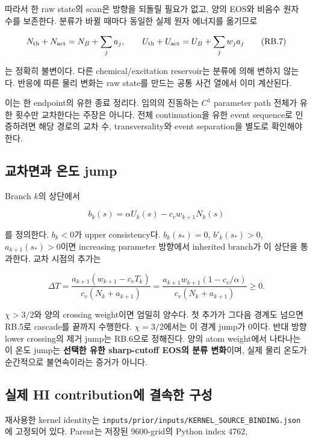 \documentclass[11pt,a4paper]{article}
\begin{document}
따라서 한 raw state의 scan은 방향을 되돌릴 필요가 없고, 양의 EOS와 비음수 원자 수를 보존한다. 분류가 바뀔 때마다 동일한 실제 원자 에너지를 옮기므로

\[N_{\rm th}+N_{\rm act}=N_B+\sum_j a_j,\qquad U_{\rm th}+U_{\rm act}=U_B+\sum_jw_ja_j\tag{RB.7}\]

는 정확히 불변이다. 다른 chemical/excitation reservoir는 분류에 의해 변하지 않는다. 반응에 따른 물리 변화는 raw state를 만드는 공통 사건 열에서 이미 계산된다.

이는 한 endpoint의 유한 종료 정리다. 임의의 진동하는 \(C^1\) parameter path 전체가 유한 횟수만 교차한다는 주장은 아니다. 전체 continuation을 유한 event sequence로 인증하려면 해당 경로의 교차 수, transversality와 event separation을 별도로 확인해야 한다.

\hypertarget{uxad50uxcc28uxba74uxacfc-uxc628uxb3c4-jump}{%
\subsection{교차면과 온도 jump}\label{uxad50uxcc28uxba74uxacfc-uxc628uxb3c4-jump}}

Branch \(k\)의 상단에서

\[b_k(s)=\alpha U_k(s)-c_vw_{k+1}N_k(s)\tag{RB.8}\]

를 정의한다. \(b_k<0\)가 upper consistency다. \(b_k(s_*)=0\), \(b'_k(s_*)>0\), \(a_{k+1}(s_*)>0\)이면 increasing parameter 방향에서 inherited branch가 이 상단을 통과한다. 교차 시점의 추가는

\[\Delta T=\frac{a_{k+1}(w_{k+1}-c_vT_k)}{c_v(N_k+a_{k+1})}
=\frac{a_{k+1}w_{k+1}(1-c_v/\alpha)}{c_v(N_k+a_{k+1})}\ge0.\tag{RB.9}\]

\(\chi>3/2\)와 양의 crossing weight이면 엄밀히 양수다. 첫 추가가 그다음 경계도 넘으면 RB.5로 cascade를 끝까지 수행한다. \(\chi=3/2\)에서는 이 경계 jump가 0이다. 반대 방향 lower crossing의 제거 jump는 RB.6으로 정해진다. 양의 atom weight에서 나타나는 이 온도 jump는 \textbf{선택한 유한 sharp-cutoff EOS의 분류 변화}이며, 실제 물리 온도가 순간적으로 불연속이라는 증거가 아니다.

\hypertarget{uxc2e4uxc81c-hi-contributionuxc5d0-uxacb0uxc18duxd55c-uxad6cuxc131}{%
\subsection{실제 HI contribution에 결속한 구성}\label{uxc2e4uxc81c-hi-contributionuxc5d0-uxacb0uxc18duxd55c-uxad6cuxc131}}

재사용한 kernel identity는 \nolinkurl{inputs/prior/inputs/KERNEL_SOURCE_BINDING.json}에 고정되어 있다. Parent는 저장된 9600-grid의 Python index 4762,
\end{document}
